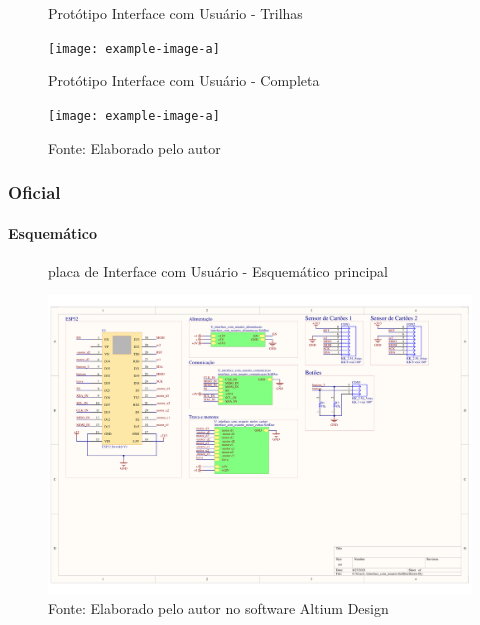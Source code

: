\documentclass[../delivery_hospital_report.tex]{subfiles}
\begin{document}
\begin{figure}[!ht]
    \centering
    \begin{minipage}{0.5\textwidth}
        \centering
        \caption{Protótipo Interface com Usuário - Trilhas}
        \texttt{[image: example-image-a]} 
        \label{fig:figura1minipg}
    \end{minipage}\hfill
    \begin{minipage}{0.5\textwidth}
        \centering
        \caption{Protótipo Interface com Usuário - Completa }
        \texttt{[image: example-image-a]} 
        \label{fig:figura1minipg}
    \end{minipage}\hfill
    \caption*{Fonte: Elaborado pelo autor }
    \label{fig:figurasminipg}
\end{figure}

\subsubsection{Oficial}

\paragraph{Esquemático}

\begin{figure}[h]
\centering
    \caption{placa de Interface com Usuário - Esquemático principal }
    \centering %
    \includegraphics[width=17cm]{modulos/interface_com_usuario-1.png}
    \caption*{Fonte: Elaborado pelo autor no software Altium Design\cite{altium21} }
    \label{Protótipo placa de ## - Esquemático principal}
\end{figure}
\end{document}
